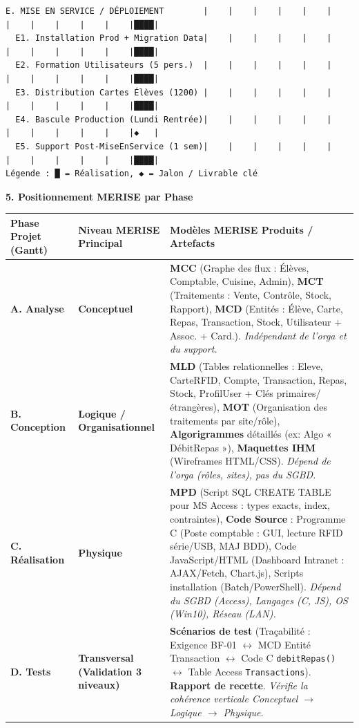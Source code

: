 \documentclass[11pt]{article}
\begin{document}
\begin{exoresolu}
\begin{lstlisting}[language=text, basicstyle=\ttfamily\small]
E. MISE EN SERVICE / DÉPLOIEMENT        |    |    |    |    |    |    |    |    |    |    |    |████|
  E1. Installation Prod + Migration Data|    |    |    |    |    |    |    |    |    |    |    |████|
  E2. Formation Utilisateurs (5 pers.)  |    |    |    |    |    |    |    |    |    |    |    |████|
  E3. Distribution Cartes Élèves (1200) |    |    |    |    |    |    |    |    |    |    |    |████|
  E4. Bascule Production (Lundi Rentrée)|    |    |    |    |    |    |    |    |    |    |    |◆   |
  E5. Support Post-MiseEnService (1 sem)|    |    |    |    |    |    |    |    |    |    |    |████|
Légende : █ = Réalisation, ◆ = Jalon / Livrable clé
\end{lstlisting}

\medskip
\textbf{5. Positionnement MERISE par Phase}

\begin{center}
\begin{tabularx}{\linewidth}{|l|X|X|}\hline
\rowcolor{popblueL}
\textbf{Phase Projet (Gantt)} & \textbf{Niveau MERISE Principal} & \textbf{Modèles MERISE Produits / Artefacts} \\\hline
\textbf{A. Analyse} & \textbf{Conceptuel} & \textbf{MCC} (Graphe des flux : Élèves, Comptable, Cuisine, Admin), \textbf{MCT} (Traitements : Vente, Contrôle, Stock, Rapport), \textbf{MCD} (Entités : Élève, Carte, Repas, Transaction, Stock, Utilisateur + Assoc. + Card.). \emph{Indépendant de l'orga et du support.} \\\hline
\textbf{B. Conception} & \textbf{Logique / Organisationnel} & \textbf{MLD} (Tables relationnelles : Eleve, CarteRFID, Compte, Transaction, Repas, Stock, ProfilUser + Clés primaires/étrangères), \textbf{MOT} (Organisation des traitements par site/rôle), \textbf{Algorigrammes} détaillés (ex: Algo « DébitRepas »), \textbf{Maquettes IHM} (Wireframes HTML/CSS). \emph{Dépend de l'orga (rôles, sites), pas du SGBD.} \\\hline
\textbf{C. Réalisation} & \textbf{Physique} & \textbf{MPD} (Script SQL CREATE TABLE pour MS Access : types exacts, index, contraintes), \textbf{Code Source} : Programme C (Poste comptable : GUI, lecture RFID série/USB, MAJ BDD), Code JavaScript/HTML (Dashboard Intranet : AJAX/Fetch, Chart.js), Scripts installation (Batch/PowerShell). \emph{Dépend du SGBD (Access), Langages (C, JS), OS (Win10), Réseau (LAN).} \\\hline
\textbf{D. Tests} & \textbf{Transversal (Validation 3 niveaux)} & \textbf{Scénarios de test} (Traçabilité : Exigence BF-01 $\leftrightarrow$ MCD Entité Transaction $\leftrightarrow$ Code C \texttt{debitRepas()} $\leftrightarrow$ Table Access \texttt{Transactions}). \textbf{Rapport de recette}. \emph{Vérifie la cohérence verticale Conceptuel $\rightarrow$ Logique $\rightarrow$ Physique.} \\\hline

\end{tabularx}
\end{center}
\end{exoresolu}
\end{document}
